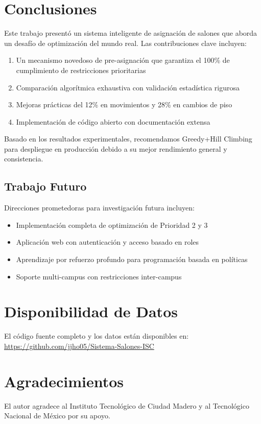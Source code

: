 \documentclass[12pt,a4paper]{article}
\begin{document}
\section{Conclusiones}

Este trabajo presentó un sistema inteligente de asignación de salones que aborda un desafío de optimización del mundo real. Las contribuciones clave incluyen:

\begin{enumerate}
\item Un mecanismo novedoso de pre-asignación que garantiza el 100\% de cumplimiento de restricciones prioritarias
\item Comparación algorítmica exhaustiva con validación estadística rigurosa
\item Mejoras prácticas del 12\% en movimientos y 28\% en cambios de piso
\item Implementación de código abierto con documentación extensa
\end{enumerate}

Basado en los resultados experimentales, recomendamos Greedy+Hill Climbing para despliegue en producción debido a su mejor rendimiento general y consistencia.

\subsection{Trabajo Futuro}

Direcciones prometedoras para investigación futura incluyen:
\begin{itemize}
\item Implementación completa de optimización de Prioridad 2 y 3
\item Aplicación web con autenticación y acceso basado en roles
\item Aprendizaje por refuerzo profundo para programación basada en políticas
\item Soporte multi-campus con restricciones inter-campus
\end{itemize}

\section*{Disponibilidad de Datos}

El código fuente completo y los datos están disponibles en: \url{https://github.com/jjho05/Sistema-Salones-ISC}

\section*{Agradecimientos}

El autor agradece al Instituto Tecnológico de Ciudad Madero y al Tecnológico Nacional de México por su apoyo.
\end{document}

